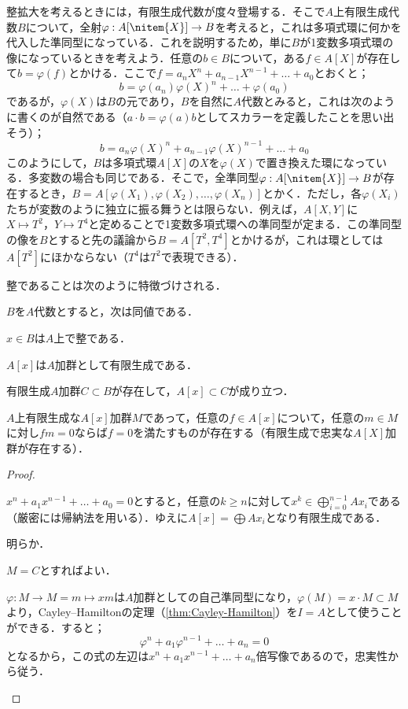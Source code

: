 整拡大を考えるときには，有限生成代数が度々登場する．そこで$A$上有限生成代数$B$について，全射$\varphi:A[\nitem{X}]\to B$を考えると，これは多項式環に何かを代入した準同型になっている．これを説明するため，単に$B$が1変数多項式環の像になっているときを考えよう．任意の$b\in B$について，ある$f\in A[X]$が存在して$b=\varphi(f)$とかける．ここで$f=a_nX^n+a_{n-1}X^{n-1}+\dots+a_0$とおくと；
\[b=\varphi(a_n)\varphi(X)^n+\dots+\varphi(a_0)\]
であるが，$\varphi(X)$は$B$の元であり，$B$を自然に$A$代数とみると，これは次のように書くのが自然である（$a\cdot b=\varphi(a)b$としてスカラーを定義したことを思い出そう）；
\[b=a_n\varphi(X)^n+a_{n-1}\varphi(X)^{n-1}+\dots+a_0\]
このようにして，$B$は多項式環$A[X]$の$X$を$\varphi(X)$で置き換えた環になっている．多変数の場合も同じである．そこで，全準同型$\varphi:A[\nitem{X}]\to B$が存在するとき，$B=A[\varphi(X_1),\varphi(X_2),\dots,\varphi(X_n)]$とかく．ただし，各$\varphi(X_i)$たちが変数のように独立に振る舞うとは限らない．例えば，$A[X,Y]$に$X\mapsto T^2，Y\mapsto T^4$と定めることで1変数多項式環への準同型が定まる．この準同型の像を$B$とすると先の議論から$B=A[T^2,T^4]$とかけるが，これは環としては$A[T^2]$にほかならない（$T^4$は$T^2$で表現できる）．

整であることは次のように特徴づけされる．
\begin{prop}\label{prop:整拡大の特徴づけ}
	$B$を$A$代数とすると，次は同値である．
	\begin{sakura}
		\item	$x\in B$は$A$上で整である．
		\item	$A[x]$は$A$加群として有限生成である．
		\item	有限生成$A$加群$C\subset B$が存在して，$A[x]\subset C$が成り立つ．
		\item	$A$上有限生成な$A[x]$加群$M$であって，任意の$f\in A[x]$について，任意の$m\in M$に対し$fm=0$ならば$f=0$を満たすものが存在する（有限生成で忠実な$A[X]$加群が存在する）．
	\end{sakura}
\end{prop}
\begin{proof}
	\begin{eqv}[4]
		\item $x^n+a_1x^{n-1}+\dots+a_0=0$とすると，任意の$k\geq n$に対して$x^k\in \bigoplus_{i=0}^{n-1}Ax_i$である（厳密には帰納法を用いる）．ゆえに$A[x]=\bigoplus Ax_i$となり有限生成である．
		
		\item 明らか．
		\item $M=C$とすればよい．
		\item $\varphi:M\to M=m\mapsto xm$は$A$加群としての自己準同型になり，$\varphi(M)=x\cdot M\subset M$より，Cayley--Hamiltonの定理（\ref{thm:Cayley-Hamilton}）を$I=A$として使うことができる．すると；
		\[\varphi^n+a_1\varphi^{n-1}+\dots+a_n=0\]
		となるから，この式の左辺は$x^n+a_1x^{n-1}+\dots+a_n$倍写像であるので，忠実性から従う．
	\end{eqv}
\end{proof}

